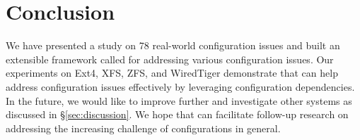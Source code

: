 \section{Conclusion}
\label{sec:conclusion}
 We have presented a study on 78 real-world configuration issues and built an extensible framework called \prj for addressing various configuration issues. Our experiments on Ext4, XFS, ZFS, and WiredTiger  demonstrate that \prj  can help address configuration issues effectively by leveraging configuration dependencies. In the future, we would like to improve \prj further and investigate other systems  as discussed in \S\ref{sec:discussion}.
 We hope that \prj can facilitate follow-up research on addressing the increasing  challenge of configurations in general.
 